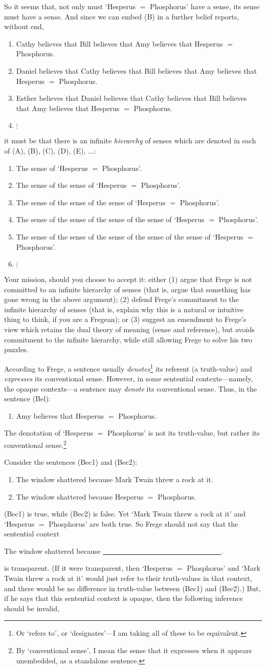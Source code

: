 \documentclass[12pt]{article}
\newcommand{\qee}{\begin{enumerate}[align=left,style=nextline,leftmargin=17pt,labelsep=5pt,font=\normalfont, topsep=10pt]}
\newcommand{\ze}{\end{enumerate}}
\newcommand{\p}{\item}
\newcommand{\e}{\emph}
\begin{document}
		So it seems that, not only must `Hesperus $=$ Phosphorus' have a sense, its sense must have a sense.  And since we can embed (B) in a further belief reports, without end,
		\qee
		\p[(C)] Cathy believes that Bill believes that Amy believes that Hesperus $=$ Phosphorus.
		\p[(D)] Daniel believes that Cathy believes that Bill believes that Amy believes that Hesperus $=$ Phosphorus.
		\p[(E)] Esther believes that Daniel believes that Cathy believes that Bill believes that Amy believes that Hesperus $=$ Phosphorus.
		\p[] $\vdots$
		\ze 
	it must be that there is an infinite \e{hierarchy} of senses which are denoted in each of (A), (B), (C), (D), (E), $\dots$:
		\qee
		\p[(A')] The sense of `Hesperus $=$ Phosphorus'.
		\p[(B')] The sense of the sense of `Hesperus $=$ Phosphorus'.
		\p[(C')] The sense of the sense of  the sense of  `Hesperus $=$ Phosphorus'.
		\p[(D')] The sense of the sense of  the sense of the sense of  `Hesperus $=$ Phosphorus'.
		\p[(E')] The sense of the sense of the sense of  the sense of the sense of  `Hesperus $=$ Phosphorus'.
		\p[] $\vdots$
		\ze 
	
	Your mission, should you choose to accept it: either (1) argue that Frege is not committed to an infinite hierarchy of senses (that is, argue that something has gone wrong in the above argument); (2) defend Frege's commitment to the infinite hierarchy of senses (that is, explain why this is a natural or intuitive thing to think, if you are a Fregean); or (3) suggest an emendment to Frege's view which retains the dual theory of meaning (sense and reference), but avoids commitment to the infinite hierarchy, while still allowing Frege to solve his two puzzles.
	
	\p According to Frege, a sentence usually \e{denotes}\footnote{ Or `refers to', or `designates'---I am taking all of these to be equivalent.} its referent (a truth-value) and \e{expresses} its conventional sense.  However, in some sentential contexts---namely, the opaque contexts---a sentence may \e{denote} its conventional sense.  Thus, in the sentence (Bel):
		\qee
		\p[(Bel)] Amy believes that Hesperus $=$ Phosphorus.
		\ze 
	The denotation of `Hesperus $=$ Phosphorus' is not its truth-value, but rather its conventional sense.\footnote{ By `conventional sense', I mean the sense that it expresses when it appears unembedded, as a standalone sentence. }
	
	Consider the sentences (Bec1) and (Bec2):
		\qee
		\p[(Bec1)]  The window shattered because Mark Twain threw a rock at it.
		\p[(Bec2)]  The window shattered because Hesperus $=$ Phosphorus.
		\ze 
(Bec1) is true, while (Bec2) is false.  Yet `Mark Twain threw a rock at it' and `Hesperus $=$ Phosphorus' are both true.   So Frege should not say that the sentential context
		\begin{center}
		The window shattered because \underline{~~~~~~~~~~~~~~~~~~~~~~~~~~~~~~~~~}.
		\end{center}
	is transparent.  (If it were transparent, then `Hesperus $=$ Phosphorus' and `Mark Twain threw a rock at it' would just refer to their truth-values in that context, and there would be no difference in truth-value between (Bec1) and (Bec2).)   But, if he says that this sentential context is opaque, then the following inference should be invalid,
	
\end{document}
